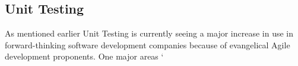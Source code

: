 \subsection{Unit Testing}
  
  As mentioned earlier Unit Testing is currently seeing a major increase in use
  in forward-thinking software development companies because of evangelical
  Agile development proponents.  One major areas `
